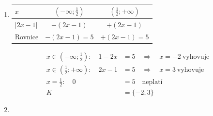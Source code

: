 \documentclass[11pt,a4paper]{article}
\begin{document}
\begin{zadaniReseniBox}[title={Domácí úkol}]
\begin{enumerate}[label=\alph*),itemsep=1pt]
\begin{center}
{\begin{tabular}{@{}lccc@{}}
$|x - 5|$ & $-(x - 5)$ & $-(x - 5)$ & $+(x - 5)$ \\
\midrule
Rovnice & $-(x + 1)=-(x - 5)$ & $+(x + 1)=-(x - 5)$ & $+(x + 1)=+(x - 5)$ \\
\bottomrule
\end{tabular}}
\endgroup
\end{center}
\[\begin{aligned}x\in (-\infty;-1):\quad - x - 1 &= 5 - x\quad\Longrightarrow\quad \text{spor}\\[2pt]
x\in (-1;5):\quad x + 1 &= 5 - x\quad\Longrightarrow\quad x=2\ \text{vyhovuje}\\[2pt]
x\in (5;+\infty):\quad x + 1 &= x - 5\quad\Longrightarrow\quad \text{spor}\\[2pt]
x=-1:\quad 0 &= 6\quad\text{neplatí}\\[2pt]
x=5:\quad 6 &= 0\quad\text{neplatí}\\[2pt]
K&=\{2\}\end{aligned}\]
\item
\begin{center}
\begingroup\footnotesize
\renewcommand{\arraystretch}{1.32}
\begin{tabular}{@{}lcc@{}}
\toprule
$x$ & $(-\infty;\frac{1}{2})$ & $(\frac{1}{2};+\infty)$ \\
\midrule
$|2 x - 1|$ & $-(2 x - 1)$ & $+(2 x - 1)$ \\
\midrule
Rovnice & $-(2 x - 1)=5$ & $+(2 x - 1)=5$ \\
\bottomrule
\end{tabular}
\endgroup
\end{center}
\[\begin{aligned}x\in (-\infty;\frac{1}{2}):\quad 1 - 2 x &= 5\quad\Longrightarrow\quad x=-2\ \text{vyhovuje}\\[2pt]
x\in (\frac{1}{2};+\infty):\quad 2 x - 1 &= 5\quad\Longrightarrow\quad x=3\ \text{vyhovuje}\\[2pt]
x=\frac{1}{2}:\quad 0 &= 5\quad\text{neplatí}\\[2pt]
K&=\{-2;3\}\end{aligned}\]
\item
\begin{center}
\begingroup\footnotesize
\renewcommand{\arraystretch}{1.32}
\end{center}
\end{enumerate}
\end{zadaniReseniBox}
\end{document}
